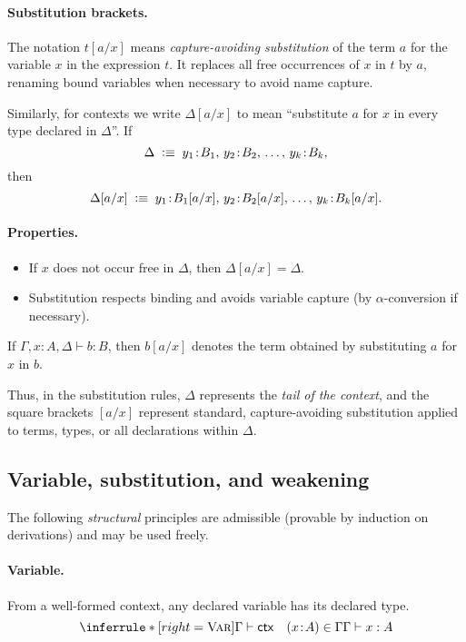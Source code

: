 \documentclass{article}
\newcommand{\defeq}{\vcentcolon\equiv}
\newcommand{\ctx}{\mathsf{ctx}}            %
\newcommand{\judg}[3]{#1 \vdash #2 : #3}   %
\newcommand{\rulename}[1]{\textsc{#1}}
\begin{document}
\paragraph{Substitution brackets.}
The notation \(t[a/x]\) means \emph{capture-avoiding substitution} of the term \(a\)
for the variable \(x\) in the expression \(t\).  
It replaces all free occurrences of \(x\) in \(t\) by \(a\), renaming bound variables when necessary to avoid name capture.

Similarly, for contexts we write \(\Delta[a/x]\) to mean “substitute \(a\) for \(x\) in every type declared in \(\Delta\)”.  
If
\[
\Delta \;\defeq\; y_1\!:\!B_1,\, y_2\!:\!B_2,\, \dots,\, y_k\!:\!B_k,
\]
then
\[
\Delta[a/x] \;\defeq\; y_1\!:\!B_1[a/x],\, y_2\!:\!B_2[a/x],\, \dots,\, y_k\!:\!B_k[a/x].
\]

\paragraph{Properties.}
\begin{itemize}
  \item If \(x\) does not occur free in \(\Delta\), then \(\Delta[a/x] = \Delta\).
  \item Substitution respects binding and avoids variable capture (by $\alpha$-conversion if necessary).
\end{itemize}
If \(\judg{\Gamma,x\!:\!A,\Delta}{b}{B}\), then \(b[a/x]\)
denotes the term obtained by substituting \(a\) for \(x\) in \(b\).

Thus, in the substitution rules, $\Delta$ represents the \emph{tail of the context}, and
the square brackets $[a/x]$ represent standard, capture-avoiding substitution applied to
terms, types, or all declarations within $\Delta$.

\subsection*{Variable, substitution, and weakening}

The following \emph{structural} principles are admissible (provable by induction on derivations) and may be used freely.

\paragraph{Variable.}
From a well-formed context, any declared variable has its declared type.
\[
\inferrule*[right=\rulename{Var}]{
  \Gamma \vdash \ctx \quad (x\!:\!A)\in\Gamma
}{
  \judg{\Gamma}{x}{A}
}
\]
\end{document}
